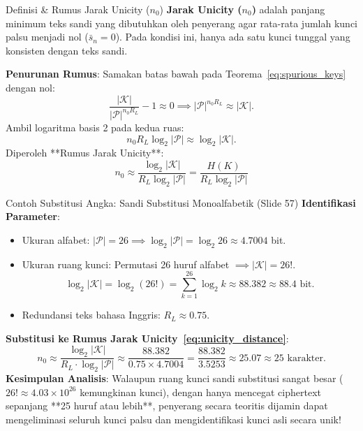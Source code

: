 \documentclass[11pt,a4paper]{article}
\begin{document}
\begin{conceptbox}{Definisi \& Rumus Jarak Unicity ($n_0$)}
\textbf{Jarak Unicity ($n_0$)} adalah panjang minimum teks sandi yang dibutuhkan oleh penyerang agar rata-rata jumlah kunci palsu menjadi nol ($\bar{s}_n = 0$). Pada kondisi ini, hanya ada satu kunci tunggal yang konsisten dengan teks sandi.

\vspace{0.2em}
\noindent\textbf{Penurunan Rumus}:
Samakan batas bawah pada Teorema~\eqref{eq:spurious_keys} dengan nol:
\[
\frac{|\mathcal{K}|}{|\mathcal{P}|^{n_0 R_L}} - 1 \approx 0 \implies |\mathcal{P}|^{n_0 R_L} \approx |\mathcal{K}|.
\]
Ambil logaritma basis 2 pada kedua ruas:
\[
n_0 R_L \log_2 |\mathcal{P}| \approx \log_2 |\mathcal{K}|.
\]
Diperoleh **Rumus Jarak Unicity**:
\begin{equation}
\label{eq:unicity_distance}
n_0 \approx \frac{\log_2 |\mathcal{K}|}{R_L \log_2 |\mathcal{P}|} = \frac{H(K)}{R_L \log_2 |\mathcal{P}|}
\end{equation}
\end{conceptbox}

\begin{examplebox}{Contoh Substitusi Angka: Sandi Substitusi Monoalfabetik (Slide 57)}
\textbf{Identifikasi Parameter}:
\begin{itemize}
    \item Ukuran alfabet: $|\mathcal{P}| = 26 \implies \log_2 |\mathcal{P}| = \log_2 26 \approx 4.7004$ bit.
    \item Ukuran ruang kunci: Permutasi 26 huruf alfabet $\implies |\mathcal{K}| = 26!$.
    \[
    \log_2 |\mathcal{K}| = \log_2(26!) = \sum_{k=1}^{26} \log_2 k \approx 88.382 \approx 88.4 \text{ bit}.
    \]
    \item Redundansi teks bahasa Inggris: $R_L \approx 0.75$.
\end{itemize}
\noindent\textbf{Substitusi ke Rumus Jarak Unicity~\eqref{eq:unicity_distance}}:
\[
n_0 \approx \frac{\log_2 |\mathcal{K}|}{R_L \cdot \log_2 |\mathcal{P}|} \approx \frac{88.382}{0.75 \times 4.7004} = \frac{88.382}{3.5253} \approx 25.07 \approx 25 \text{ karakter}.
\]
\textbf{Kesimpulan Analisis}: Walaupun ruang kunci sandi substitusi sangat besar ($26! \approx 4.03 \times 10^{26}$ kemungkinan kunci), dengan hanya mencegat ciphertext sepanjang **25 huruf atau lebih**, penyerang secara teoritis dijamin dapat mengeliminasi seluruh kunci palsu dan mengidentifikasi kunci asli secara unik!
\end{examplebox}
\end{document}
